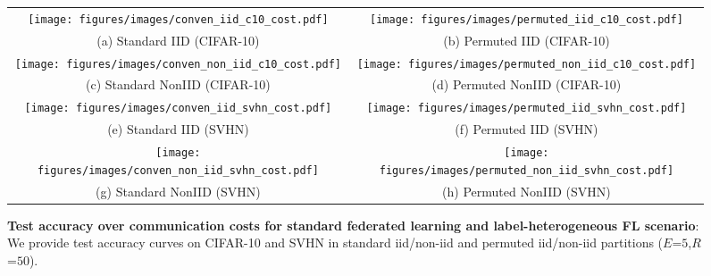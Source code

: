 \begin{figure*}
    \centering
    
    \begin{tabular}{c c }
         
         \texttt{[image: figures/images/conven\_iid\_c10\_cost.pdf]} & \texttt{[image: figures/images/permuted\_iid\_c10\_cost.pdf]} \\
         (a) Standard IID (CIFAR-10) & (b) Permuted IID (CIFAR-10) \\
         
         \texttt{[image: figures/images/conven\_non\_iid\_c10\_cost.pdf]} & \texttt{[image: figures/images/permuted\_non\_iid\_c10\_cost.pdf]} \\
         (c) Standard NonIID (CIFAR-10) & (d) Permuted NonIID (CIFAR-10) \\
         
         \texttt{[image: figures/images/conven\_iid\_svhn\_cost.pdf]} & \texttt{[image: figures/images/permuted\_iid\_svhn\_cost.pdf]} \\
         (e) Standard IID (SVHN) & (f) Permuted IID (SVHN) \\
         
         \texttt{[image: figures/images/conven\_non\_iid\_svhn\_cost.pdf]} &  \texttt{[image: figures/images/permuted\_non\_iid\_svhn\_cost.pdf]} \\
         (g) Standard NonIID (SVHN) & (h) Permuted NonIID (SVHN) \\
         
    \end{tabular}
    \caption{\textbf{Test accuracy over communication costs for standard federated learning and label-heterogeneous FL scenario}: We provide test accuracy curves on CIFAR-10 and SVHN in standard iid/non-iid and permuted iid/non-iid partitions ($E$=$5$,$R$=$50$). }
    \label{fig:all}
\end{figure*}